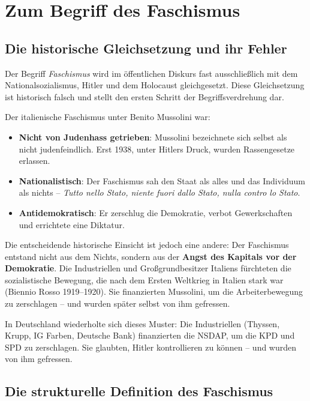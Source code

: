 \section{Zum Begriff des Faschismus}

\subsection{Die historische Gleichsetzung und ihr Fehler}

Der Begriff \emph{Faschismus} wird im öffentlichen Diskurs fast ausschließlich mit dem Nationalsozialismus, Hitler und dem Holocaust gleichgesetzt. Diese Gleichsetzung ist historisch falsch und stellt den ersten Schritt der Begriffsverdrehung dar.

Der italienische Faschismus unter Benito Mussolini war:

\begin{itemize}
    \item \textbf{Nicht von Judenhass getrieben}: Mussolini bezeichnete sich selbst als nicht judenfeindlich. Erst 1938, unter Hitlers Druck, wurden Rassengesetze erlassen.
    \item \textbf{Nationalistisch}: Der Faschismus sah den Staat als alles und das Individuum als nichts – \emph{Tutto nello Stato, niente fuori dallo Stato, nulla contro lo Stato}.
    \item \textbf{Antidemokratisch}: Er zerschlug die Demokratie, verbot Gewerkschaften und errichtete eine Diktatur.
\end{itemize}

Die entscheidende historische Einsicht ist jedoch eine andere: Der Faschismus entstand nicht aus dem Nichts, sondern aus der \textbf{Angst des Kapitals vor der Demokratie}. Die Industriellen und Großgrundbesitzer Italiens fürchteten die sozialistische Bewegung, die nach dem Ersten Weltkrieg in Italien stark war (Biennio Rosso 1919–1920). Sie finanzierten Mussolini, um die Arbeiterbewegung zu zerschlagen – und wurden später selbst von ihm gefressen.

In Deutschland wiederholte sich dieses Muster: Die Industriellen (Thyssen, Krupp, IG Farben, Deutsche Bank) finanzierten die NSDAP, um die KPD und SPD zu zerschlagen. Sie glaubten, Hitler kontrollieren zu können – und wurden von ihm gefressen.

\subsection{Die strukturelle Definition des Faschismus}

